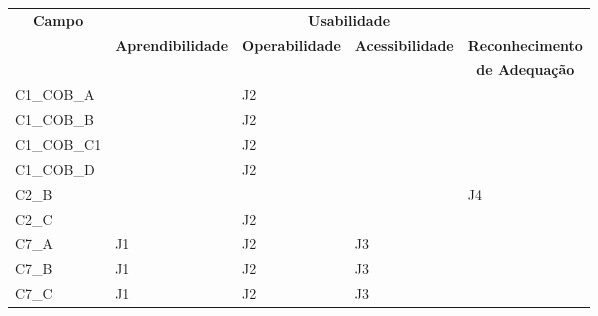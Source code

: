 \begin{longtable}{|l|l|l|l|l|}
\endfirsthead
\endhead
\hline
\multicolumn{1}{|c|}{\multirow{2}{*}{\textbf{Campo}}} & \multicolumn{4}{c|}{\textbf{Usabilidade}}             \\ \cline{2-5} 
\multicolumn{1}{|c|}{}                                & \textbf{Aprendibilidade} & \textbf{Operabilidade} & \textbf{Acessibilidade} & \multicolumn{1}{c|}{\textbf{Reconhecimento}} \\
\multicolumn{1}{|c|}{}                                &                          &                        &                         & \multicolumn{1}{c|}{\textbf{de Adequação}}   \\ \hline
C1\_COB\_A                                           &                          & J2                     &                         &                                               \\ \hline
C1\_COB\_B                                           &                          & J2                     &                         &                                               \\ \hline
C1\_COB\_C1                                          &                          & J2                     &                         &                                               \\ \hline
C1\_COB\_D                                           &                          & J2                     &                         &                                               \\ \hline
C2\_B                                                &                          &                        &                         & J4                                            \\ \hline
C2\_C                                                &                          & J2                     &                         &                                               \\ \hline
C7\_A                                                & J1                       & J2                     & J3                     &                                               \\ \hline
C7\_B                                                & J1                       & J2                     & J3                     &                                               \\ \hline
C7\_C                                                & J1                       & J2                     & J3                     &                                               \\ \hline

\end{longtable}
